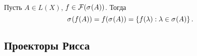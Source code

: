 \begin{theorem}\hfill\\
    \indent Пусть $A \in L(X)$, $f \in \mathcal F(\spectrum{A})$. Тогда
    \[ \spectrum{f(A)} = f(\spectrum{A}) = \menge{f(\lambda) : \lambda \in \spectrum{A}}. \]
\end{theorem}

\subsection{Проекторы Рисса}
